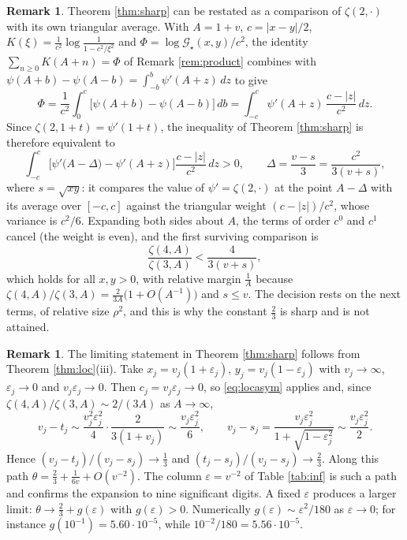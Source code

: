\documentclass[11pt,a4paper]{amsart}
\theoremstyle{definition}
\newtheorem{remark}[theorem]{Remark}
\newcommand{\Gs}{\mathcal{G}_{\star}}
\newcommand{\eps}{\varepsilon}
\begin{document}
\begin{remark}\label{rem:equiv}
Theorem \ref{thm:sharp} can be restated as a comparison of $\zeta(2,\cdot)$ with its
own triangular average. With $A=1+v$, $c=|x-y|/2$,
$K(\xi)=\frac{1}{c^{2}}\log\frac{1}{1-c^{2}/\xi^{2}}$ and
$\Phi=\log\Gs(x,y)/c^{2}$, the identity $\sum_{n\ge0}K(A+n)=\Phi$ of
Remark \ref{rem:product} combines with
$\psi(A+b)-\psi(A-b)=\int_{-b}^{b}\psi'(A+z)\,dz$ to give
\[
  \Phi=\frac{1}{c^{2}}\int_{0}^{c}\big[\psi(A+b)-\psi(A-b)\big]\,db
     =\int_{-c}^{c}\psi'(A+z)\,\frac{c-|z|}{c^{2}}\,dz .
\]
Since $\zeta(2,1+t)=\psi'(1+t)$, the inequality of Theorem \ref{thm:sharp} is therefore
equivalent to
\[
  \int_{-c}^{c}\Big[\psi'\!\big(A-\Delta\big)-\psi'(A+z)\Big]\frac{c-|z|}{c^{2}}\,dz>0,
  \qquad \Delta=\frac{v-s}{3}=\frac{c^{2}}{3(v+s)},
\]
where $s=\sqrt{xy}$: it compares the value of $\psi'=\zeta(2,\cdot)$ at the point
$A-\Delta$ with its average over $[-c,c]$ against the triangular weight $(c-|z|)/c^{2}$,
whose variance is $c^{2}/6$. Expanding both sides about $A$, the terms of order $c^{0}$ and
$c^{1}$ cancel (the weight is even), and the first surviving comparison is
\[
  \frac{\zeta(4,A)}{\zeta(3,A)}<\frac{4}{3(v+s)} ,
\]
which holds for all $x,y>0$, with relative margin $\frac{1}{A}$ because
$\zeta(4,A)/\zeta(3,A)=\frac{2}{3A}\big(1+O(A^{-1})\big)$ and $s\le v$. The decision rests
on the next terms, of relative size $\rho^{2}$, and this is why the constant $\frac23$ is
sharp and is not attained.
\end{remark}

\begin{remark}\label{rem:limit}
The limiting statement in Theorem \ref{thm:sharp} follows from Theorem
\ref{thm:loc}(iii). Take $x_{j}=v_{j}(1+\eps_{j})$, $y_{j}=v_{j}(1-\eps_{j})$ with
$v_{j}\to\infty$, $\eps_{j}\to0$ and $v_{j}\eps_{j}\to0$. Then $c_{j}=v_{j}\eps_{j}\to0$,
so \eqref{eq:locasym} applies and, since $\zeta(4,A)/\zeta(3,A)\sim2/(3A)$ as
$A\to\infty$,
\[
  v_{j}-t_{j}\sim\frac{v_{j}^{2}\eps_{j}^{2}}{4}\cdot\frac{2}{3(1+v_{j})}
  \sim\frac{v_{j}\eps_{j}^{2}}{6},
  \qquad
  v_{j}-s_{j}=\frac{v_{j}\eps_{j}^{2}}{1+\sqrt{1-\eps_{j}^{2}}}\sim\frac{v_{j}\eps_{j}^{2}}{2}.
\]
Hence $(v_{j}-t_{j})/(v_{j}-s_{j})\to\frac13$ and
$(t_{j}-s_{j})/(v_{j}-s_{j})\to\frac23$. Along this path
$\theta=\frac23+\frac{1}{6v}+O(v^{-2})$. The column $\eps=v^{-2}$ of Table \ref{tab:inf} is such a
path and confirms the expansion to nine significant digits. A fixed $\eps$ produces a
larger limit: $\theta\to\frac23+g(\eps)$ with $g(\eps)>0$. Numerically
$g(\eps)\sim\eps^{2}/180$ as $\eps\to0$; for instance $g(10^{-1})=5.60\cdot10^{-5}$, while
$10^{-2}/180=5.56\cdot10^{-5}$.
\end{remark}
\end{document}
